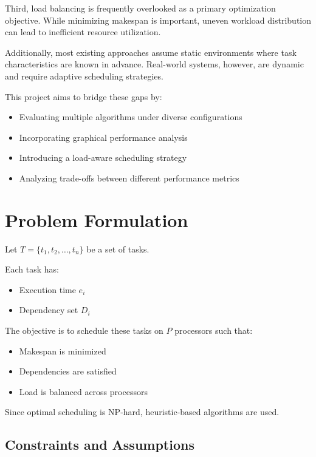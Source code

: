 \documentclass[12pt,a4paper]{article}
\begin{document}
Third, load balancing is frequently overlooked as a primary optimization objective. While minimizing makespan is important, uneven workload distribution can lead to inefficient resource utilization.

Additionally, most existing approaches assume static environments where task characteristics are known in advance. Real-world systems, however, are dynamic and require adaptive scheduling strategies.

This project aims to bridge these gaps by:
\begin{itemize}
\item Evaluating multiple algorithms under diverse configurations
\item Incorporating graphical performance analysis
\item Introducing a load-aware scheduling strategy
\item Analyzing trade-offs between different performance metrics
\end{itemize}




	\newpage
	\section{Problem Formulation}

Let $T = \{t_1, t_2, \dots, t_n\}$ be a set of tasks.

Each task has:
\begin{itemize}
\item Execution time $e_i$
\item Dependency set $D_i$
\end{itemize}
The objective is to schedule these tasks on $P$ processors such that:
\begin{itemize}
\item Makespan is minimized
\item Dependencies are satisfied
\item Load is balanced across processors
\end{itemize}
Since optimal scheduling is NP-hard, heuristic-based algorithms are used.

\subsection*{Constraints and Assumptions}
\end{document}
